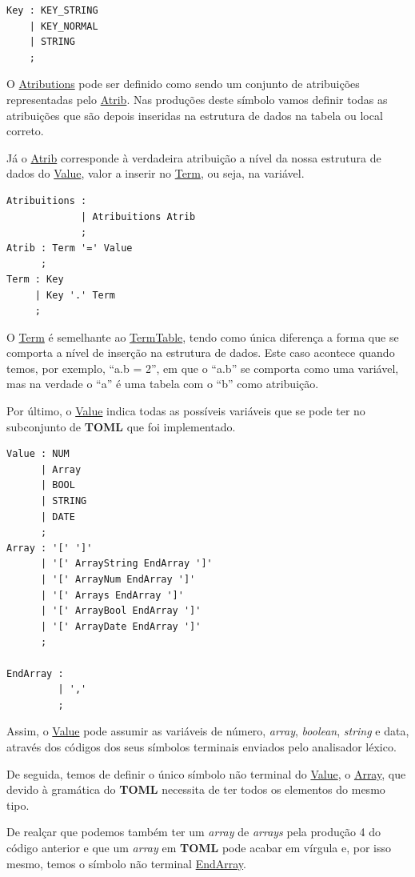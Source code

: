 \documentclass[a4paper,12pt]{report}
\begin{document}
\begin{verbatim}
Key : KEY_STRING                                      
    | KEY_NORMAL                                      
    | STRING                                        
    ;
\end{verbatim}


\par O \underline{Atributions} pode ser definido como sendo um conjunto de atribuições representadas pelo \underline{Atrib}. Nas produções deste símbolo vamos definir todas as atribuições que são depois inseridas na estrutura de dados na tabela ou local correto.
\par Já o \underline{Atrib} corresponde à verdadeira atribuição a nível da nossa estrutura de dados do \underline{Value}, valor a inserir no \underline{Term}, ou seja, na variável.

\begin{verbatim}
Atribuitions : 
             | Atribuitions Atrib
             ;
Atrib : Term '=' Value
      ;
Term : Key
     | Key '.' Term
     ;
\end{verbatim}

O \underline{Term} é semelhante ao \underline{TermTable}, tendo como única diferença a forma que se comporta a nível de inserção na estrutura de dados. Este caso acontece quando temos, por exemplo, ``a.b = 2'', em que o ``a.b'' se comporta como uma variável, mas na verdade o ``a'' é uma tabela com o ``b'' como atribuição.

\par Por último, o \underline{Value} indica todas as possíveis variáveis que se pode ter no subconjunto de \textbf{TOML} que foi implementado.

\begin{verbatim}
Value : NUM
      | Array
      | BOOL
      | STRING
      | DATE
      ;
Array : '[' ']'
      | '[' ArrayString EndArray ']'
      | '[' ArrayNum EndArray ']'
      | '[' Arrays EndArray ']'
      | '[' ArrayBool EndArray ']'
      | '[' ArrayDate EndArray ']'
      ;

EndArray : 
         | ','
         ; 
\end{verbatim}

\par Assim, o \underline{Value} pode assumir as variáveis de número, \textit{array}, \textit{boolean}, \textit{string} e data, através dos códigos dos seus símbolos terminais enviados pelo analisador léxico.
\par De seguida, temos de definir o único símbolo não terminal do \underline{Value}, o \underline{Array}, que devido à gramática do \textbf{TOML} necessita de ter todos os elementos do mesmo tipo. 
\vspace{0.3cm}
\par De realçar que podemos também ter um \textit{array} de \textit{arrays} pela produção 4 do código anterior e que um \textit{array} em \textbf{TOML} pode acabar em vírgula e, por isso mesmo, temos o símbolo não terminal \underline{EndArray}.
\end{document}
